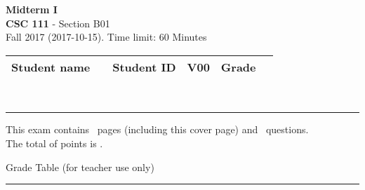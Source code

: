 \documentclass[12pt]{exam}
\newcommand{\class}{CSC 111}
\renewcommand{\section}{B01}
\newcommand{\term}{Fall 2017}
\newcommand{\examtitle}{Midterm I}
\newcommand{\examdate}{2017-10-15}
\newcommand{\timelimit}{60 Minutes}
\begin{document}
\noindent
\textbf{\examtitle} \\
\textbf{\class} - Section \section \\
\term{} (\examdate). Time limit: \timelimit \\

\noindent
\begin{tabularx}{\textwidth}{|X|X|X|X|X|X|}
    \hline
    \small{Student name} & \small{} & \small{Student ID} & \small\bfseries{V00} & \small{Grade} & \small{} \\
    \hline
\end{tabularx}

\noindent \\
\rule[2ex]{\textwidth}{2pt}

\noindent
This exam contains \numpages\ pages (including this cover page) and \numquestions\ questions. \\
The total of points is \numpoints.

\begin{center}
\small{Grade Table (for teacher use only)} \\
\addpoints
\gradetable[v][questions]
\end{center}

\noindent
\rule[2ex]{\textwidth}{2pt}
\end{document}
